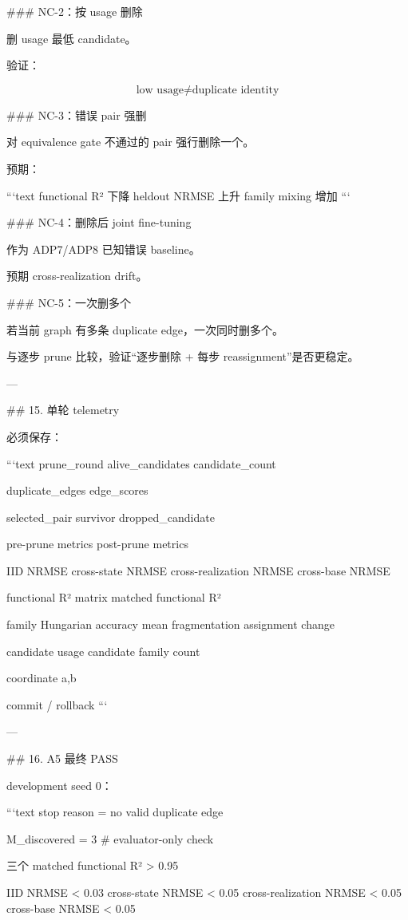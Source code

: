 ### NC-2：按 usage 删除

删 usage 最低 candidate。

验证：

\[
\boxed{
\text{low usage}\neq\text{duplicate identity}
}
\]

### NC-3：错误 pair 强删

对 equivalence gate 不通过的 pair 强行删除一个。

预期：

```text
functional R² 下降
heldout NRMSE 上升
family mixing 增加
```

### NC-4：删除后 joint fine-tuning

作为 ADP7/ADP8 已知错误 baseline。

预期 cross-realization drift。

### NC-5：一次删多个

若当前 graph 有多条 duplicate edge，一次同时删多个。

与逐步 prune 比较，验证“逐步删除 + 每步 reassignment”是否更稳定。

---

## 15. 单轮 telemetry

必须保存：

```text
prune_round
alive_candidates
candidate_count

duplicate_edges
edge_scores

selected_pair
survivor
dropped_candidate

pre-prune metrics
post-prune metrics

IID NRMSE
cross-state NRMSE
cross-realization NRMSE
cross-base NRMSE

functional R² matrix
matched functional R²

family Hungarian accuracy
mean fragmentation
assignment change

candidate usage
candidate family count

coordinate a,b

commit / rollback
```

---

## 16. A5 最终 PASS

development seed 0：

```text
stop reason = no valid duplicate edge

M_discovered = 3        # evaluator-only check

三个 matched functional R² > 0.95

IID NRMSE < 0.03
cross-state NRMSE < 0.05
cross-realization NRMSE < 0.05
cross-base NRMSE < 0.05

